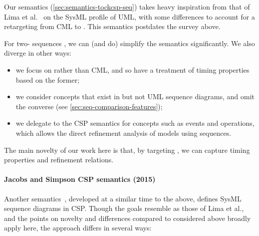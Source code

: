 Our \tockcsp{} semantics (\cref{sec:semantics-tockcsp-seq}) takes heavy inspiration
from that of Lima et al.~\cite{lima-semantics} on the SysML profile of UML, with
some differences to account for a retargeting from CML to \tockcsp.  This
semantics postdates the survey above.

For two-\mactor{} sequences , we can (and do)
simplify the semantics significantly.  We also diverge in other ways:

\begin{itemize}
\item we focus on \tockcsp{} rather than CML, and so have a
  treatment of timing properties based on the former;
\item
  we consider concepts that exist in \langname{} but not UML sequence
  diagrams, and omit the converse
  (see \cref{sec:seq-comparison-features});
\item
  we delegate to the \robostar{} CSP semantics for concepts such as events and
  operations, which allows the direct refinement analysis of \robostar{} models
  using sequences.
\end{itemize}

The main novelty of our work here is that, by targeting \tockcsp, we can capture
timing properties and refinement relations.

\paragraph{Jacobs and Simpson CSP semantics (2015)}

Another semantics~\cite{Jacobs15-SeqCSP}, developed at a similar time to
the above, defines SysML sequence diagrams in CSP.
Though the goals resemble as those of Lima et al.,
and the points on novelty and differences compared to \langname{} considered
above broadly apply here, the approach differs in several ways:

